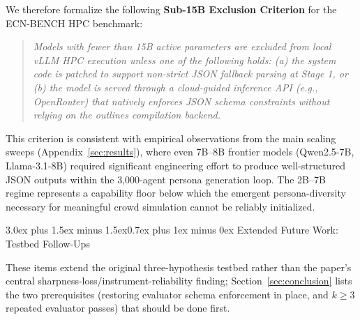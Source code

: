 \documentclass[11pt,journal,onecolumn]{IEEEtran}
\makeatletter
\renewcommand\section{\@startsection{section}{1}{\z@}%
  {3.0ex plus 1.5ex minus 1.5ex}{0.7ex plus 1ex minus 0ex}%
  {\normalfont\normalsize\centering\bfseries}}
\makeatother
\begin{document}
We therefore formalize the following \textbf{Sub-15B Exclusion Criterion} for the ECN-BENCH HPC benchmark:

\begin{quote}
\textit{Models with fewer than 15B active parameters are excluded from local vLLM HPC execution unless one of the following holds: (a) the system code is patched to support non-strict JSON fallback parsing at Stage 1, or (b) the model is served through a cloud-guided inference API (e.g., OpenRouter) that natively enforces JSON schema constraints without relying on the outlines compilation backend.}
\end{quote}

This criterion is consistent with empirical observations from the main scaling sweeps (Appendix~\ref{sec:results}), where even 7B--8B frontier models (Qwen2.5-7B, Llama-3.1-8B) required significant engineering effort to produce well-structured JSON outputs within the 3,000-agent persona generation loop. The 2B--7B regime represents a capability floor below which the emergent persona-diversity necessary for meaningful crowd simulation cannot be reliably initialized.




\section{Extended Future Work: Testbed Follow-Ups}
\label{sec:extended_future_work}

These items extend the original three-hypothesis testbed rather than the paper's central sharpness-loss/\allowbreak instrument-reliability finding; Section~\ref{sec:conclusion} lists the two prerequisites (restoring evaluator schema enforcement in place, and $k \geq 3$ repeated evaluator passes) that should be done first.
\end{document}

